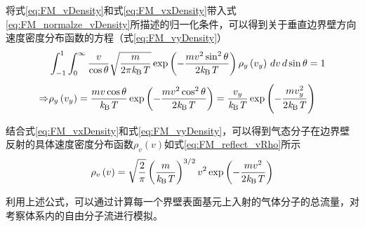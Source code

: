     将式\eqref{eq:FM_vDensity}和式\eqref{eq:FM_vxDensity}带入式\eqref{eq:FM_normalze_vDensity}所描述的归一化条件，可以得到关于垂直边界壁方向速度密度分布函数的方程（式\eqref{eq:FM_vyDensity}）\chinesecolon
    \begin{equation}
        \label{eq:FM_vyDensity}
        \begin{split}
            & \int_{-1}^{1} \int_{0}^{\infty} \frac{v}{\cos\theta} \sqrt{\frac{m}{2\pi\it k_{\rm B} \it T}}\exp\left({-\frac{mv^2\sin^2\theta}{2\it k_{\rm B} \it T}}\right)\rho_y\left(v_y\right) \,dv  \,d\sin\theta =1\\[+1ex]
\Rightarrow & \rho_y\left(v_y\right)=\frac{mv\cos\theta}{\it k_{\rm B} \it T}\exp\left({-\frac{mv^2\cos^2\theta}{2\it k_{\rm B} \it T}}\right)=\frac{v_y}{\it k_{\rm B} \it T}\exp\left(-\frac{mv_y^2}{2\it k_{\rm B} \it T}\right)
        \end{split}
    \end{equation}

    结合式\eqref{eq:FM_vxDensity}和式\eqref{eq:FM_vyDensity}，可以得到气态分子在边界壁反射的具体速度密度分布函数$\rho_v\left(v\right)$如式\eqref{eq:FM_reflect_vRho}所示\chinesecolon
    \begin{equation}
        \label{eq:FM_reflect_vRho}
        \rho_v\left(v\right)=\sqrt{\frac{2}{\pi}} \left(\frac{m}{\it k_{\rm B} \it T}\right)^{3/ 2}v^2\exp{\left(-\frac{mv^2}{2\it k_{\rm B} \it T}\right)}
    \end{equation}

    利用上述公式，可以通过计算每一个界壁表面基元上入射的气体分子的总流量，对考察体系内的自由分子流进行模拟。